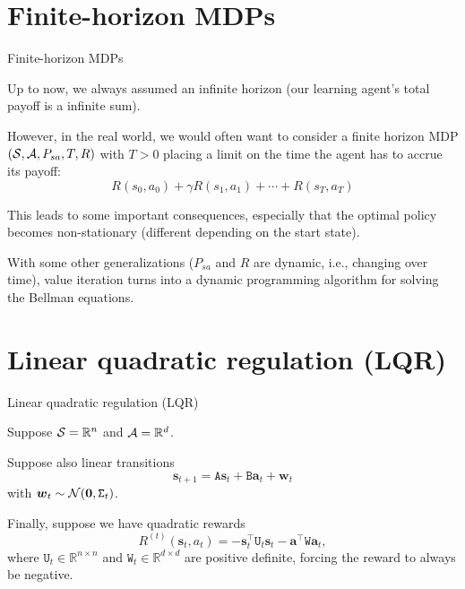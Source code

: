 \documentclass{beamer}
\renewcommand{\vec}[1]{\boldsymbol{#1}}
\newcommand{\mat}[1]{\mathtt{#1}}
\def\Rset{\mathbb{R}}
\begin{document}
\section{Finite-horizon MDPs}

\begin{frame}{Finite-horizon MDPs}

  Up to now, we always assumed an \alert{infinite horizon}
  (our learning agent's total payoff is a infinite sum).
  
  \medskip

  However, in the real world, we would often want to consider a
  \alert{finite horizon} MDP $({\cal S},{\cal A},P_{sa},T,R)$ with $T>0$
  placing a \alert{limit} on the time the agent has to accrue its
  payoff:
  \[ R(s_0,a_0) + \gamma R(s_1,a_1) + \cdots + R(s_T,a_T) \]

  \medskip

  This leads to some important consequences, especially that the
  optimal policy becomes \alert{non-stationary} (different depending
  on the start state).

  \medskip

  With some other generalizations ($P_{sa}$ and $R$ are dynamic, i.e.,
  changing over time), value iteration turns into a \alert{dynamic
    programming} algorithm for solving the Bellman equations.
  
\end{frame}

\section{Linear quadratic regulation (LQR)}

\begin{frame}{Linear quadratic regulation (LQR)}

  Suppose ${\cal S} = \Rset^n$ and ${\cal A} = \Rset^d$.

  \medskip

  Suppose also \alert{linear transitions}
  \[ \vec{s}_{t+1} = \mat{A}\vec{s}_t + \mat{B}\vec{a}_t + \vec{w}_t \]
  with $\vec{w}_t \sim {\cal N}(\vec{0},\mat{\Sigma}_t)$.

  \medskip

  Finally, suppose we have \alert{quadratic rewards}
  \[ R^{(t)}(\vec{s}_t,a_t) = - \vec{s}_t^\top\mat{U}_t\vec{s}_t
                             - \vec{a}^\top \mat{W}\vec{a}_t, \]
  where $\mat{U}_t \in \Rset^{n\times n}$ and $\mat{W}_t \in
  \Rset^{d\times d}$ are positive definite, forcing the reward to
  always be negative.
  
\end{frame}
\end{document}
